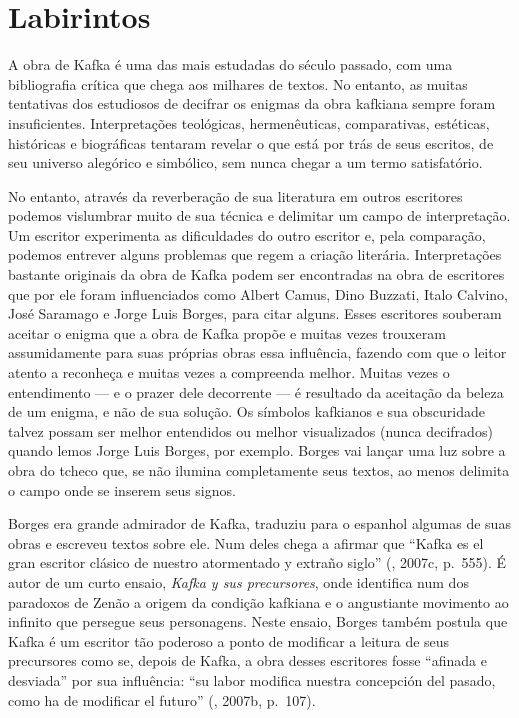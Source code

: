 \chapter{Labirintos}

A obra de Kafka é uma das mais estudadas do século passado, com uma
bibliografia crítica que chega aos milhares de textos. No entanto, as
muitas tentativas dos estudiosos de decifrar os enigmas da obra kafkiana
sempre foram insuficientes. Interpretações teológicas, hermenêuticas,
comparativas, estéticas, históricas e biográficas tentaram revelar o
que está por trás de seus escritos, de seu universo alegórico e
simbólico, sem nunca chegar a um termo satisfatório.

No entanto, através da reverberação de sua literatura em outros
escritores podemos vislumbrar muito de sua técnica e delimitar um campo
de interpretação. Um escritor experimenta as dificuldades do outro
escritor e, pela comparação, podemos entrever alguns problemas que regem
a criação literária. Interpretações bastante originais da obra de Kafka
podem ser encontradas na obra de escritores que por ele foram
influenciados como Albert Camus, Dino Buzzati, Italo Calvino, José
Saramago e Jorge Luis Borges, para citar alguns. Esses escritores
souberam aceitar o enigma que a obra de Kafka propõe e muitas vezes
trouxeram assumidamente para suas próprias obras essa influência,
fazendo com que o leitor atento a reconheça e muitas vezes a compreenda
melhor. Muitas vezes o entendimento --- e o prazer dele decorrente --- é
resultado da aceitação da beleza de um enigma, e não de sua solução. Os
símbolos kafkianos e sua obscuridade talvez possam ser melhor entendidos
ou melhor visualizados (nunca decifrados) quando lemos Jorge Luis
Borges, por exemplo. Borges vai lançar uma luz sobre a obra do tcheco
que, se não ilumina completamente seus textos, ao menos delimita o campo
onde se inserem seus signos.

Borges era grande admirador de
  Kafka, traduziu para o espanhol algumas de suas obras e escreveu
  textos sobre ele. Num deles chega a afirmar que ``Kafka es el gran
  escritor clásico de nuestro atormentado y extraño siglo'' (,
  2007c, p.~555). É autor de um curto ensaio, \emph{Kafka y sus
    precursores}, onde identifica num dos paradoxos de Zenão a origem da
  condição kafkiana e o angustiante movimento ao infinito que persegue
  seus personagens. Neste ensaio, Borges também postula que Kafka é um
  escritor tão poderoso a ponto de modificar a leitura de seus
  precursores como se, depois de Kafka, a obra desses escritores fosse
  ``afinada e desviada'' por sua influência: ``su labor modifica nuestra
  concepción del pasado, como ha de modificar el futuro'' (,
  2007b, p.~107).

